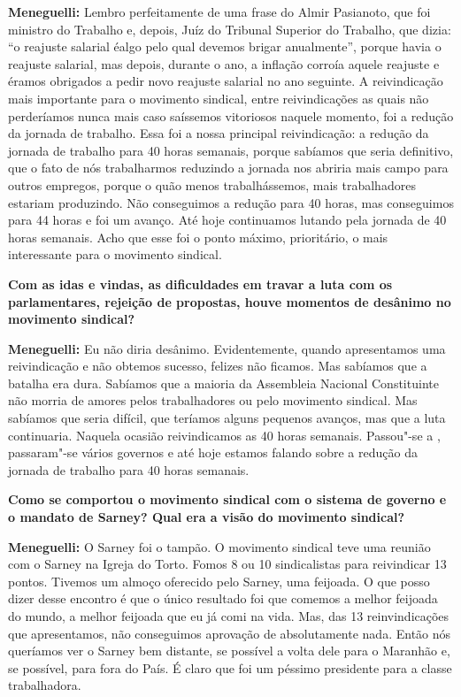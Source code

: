 \textbf{Meneguelli:} Lembro perfeitamente de uma frase do Almir
Pasianoto, que foi ministro do Trabalho e, depois, Juíz do Tribunal
Superior do Trabalho, que dizia: ``o reajuste salarial éalgo pelo qual
devemos brigar anualmente'', porque havia o reajuste salarial, mas
depois, durante o ano, a inflação corroía aquele reajuste e éramos
obrigados a pedir novo reajuste salarial no ano seguinte. A
reivindicação mais importante para o movimento sindical, entre
reivindicações as quais não perderíamos nunca mais caso saíssemos
vitoriosos naquele momento, foi a redução da jornada de trabalho. Essa
foi a nossa principal reivindicação: a redução da jornada de trabalho
para 40 horas semanais, porque sabíamos que seria definitivo, que o fato
de nós trabalharmos reduzindo a jornada nos abriria mais campo para
outros empregos, porque o quão menos trabalhássemos, mais trabalhadores
estariam produzindo. Não conseguimos a redução para 40 horas, mas
conseguimos para 44 horas e foi um avanço. Até hoje continuamos lutando
pela jornada de 40 horas semanais. Acho que esse foi o ponto máximo,
prioritário, o mais interessante para o movimento sindical.

\textbf{Com as idas e vindas, as dificuldades em travar a luta com os
parlamentares, rejeição de propostas, houve momentos de desânimo no
movimento sindical?}

\textbf{Meneguelli:} Eu não diria desânimo. Evidentemente, quando
apresentamos uma reivindicação e não obtemos sucesso, felizes não
ficamos. Mas sabíamos que a batalha era dura. Sabíamos que a maioria da
Assembleia Nacional Constituinte não morria de amores pelos
trabalhadores ou pelo movimento sindical. Mas sabíamos que seria
difícil, que teríamos alguns pequenos avanços, mas que a luta
continuaria. Naquela ocasião reivindicamos as 40 horas semanais.
Passou"-se a , passaram"-se vários governos e até hoje estamos falando
sobre a redução da jornada de trabalho para 40 horas semanais.

\textbf{Como se comportou o movimento sindical com o sistema de governo
e o mandato de Sarney? Qual era a visão do movimento sindical?}

\textbf{Meneguelli:} O Sarney foi o tampão. O movimento sindical teve
uma reunião com o Sarney na Igreja do Torto. Fomos 8 ou 10 sindicalistas
para reivindicar 13 pontos. Tivemos um almoço oferecido pelo Sarney, uma
feijoada. O que posso dizer desse encontro é que o único resultado foi
que comemos a melhor feijoada do mundo, a melhor feijoada que eu já comi
na vida. Mas, das 13 reinvindicações que apresentamos, não conseguimos
aprovação de absolutamente nada. Então nós queríamos ver o Sarney bem
distante, se possível a volta dele para o Maranhão e, se possível, para
fora do País. É claro que foi um péssimo presidente para a classe
trabalhadora.

